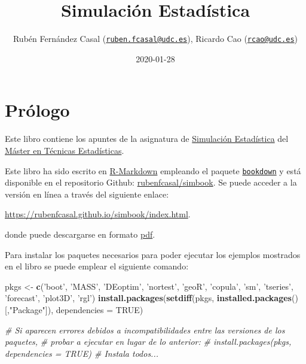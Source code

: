 \documentclass[]{book}
\title{Simulación Estadística}
\author{Rubén Fernández Casal
(\href{mailto:ruben.fcasal@udc.es}{\nolinkurl{ruben.fcasal@udc.es}}),
Ricardo Cao (\href{mailto:rcao@udc.es}{\nolinkurl{rcao@udc.es}})}
\date{2020-01-28}
\newenvironment{Shaded}{\begin{snugshade}}{\end{snugshade}}
\newcommand{\KeywordTok}[1]{\textcolor[rgb]{0.13,0.29,0.53}{\textbf{#1}}}
\newcommand{\DataTypeTok}[1]{\textcolor[rgb]{0.13,0.29,0.53}{#1}}
\newcommand{\StringTok}[1]{\textcolor[rgb]{0.31,0.60,0.02}{#1}}
\newcommand{\CommentTok}[1]{\textcolor[rgb]{0.56,0.35,0.01}{\textit{#1}}}
\newcommand{\OtherTok}[1]{\textcolor[rgb]{0.56,0.35,0.01}{#1}}
\newcommand{\NormalTok}[1]{#1}
\theoremstyle{definition}
\theoremstyle{definition}
\theoremstyle{definition}
\theoremstyle{remark}
\begin{document}
\maketitle

{
\setcounter{tocdepth}{1}
\tableofcontents
}
\chapter*{Prólogo}\label{prologo}

Este libro contiene los apuntes de la asignatura de
\href{http://eamo.usc.es/pub/mte/index.php/es/?option=com_content\&view=article\&id=2201\&idm=13\&a\%C3\%B1o=2019}{Simulación
Estadística} del \href{http://eio.usc.es/pub/mte}{Máster en Técnicas
Estadísticas}.

Este libro ha sido escrito en
\href{http://rmarkdown.rstudio.com}{R-Markdown} empleando el paquete
\href{https://bookdown.org/yihui/bookdown/}{\texttt{bookdown}} y está
disponible en el repositorio Github:
\href{https://github.com/rubenfcasal/simbook}{rubenfcasal/simbook}. Se
puede acceder a la versión en línea a través del siguiente enlace:

\url{https://rubenfcasal.github.io/simbook/index.html}.

donde puede descargarse en formato
\href{https://rubenfcasal.github.io/simbook/Simulacion.pdf}{pdf}.

Para instalar los paquetes necesarios para poder ejecutar los ejemplos
mostrados en el libro se puede emplear el siguiente comando:

\begin{Shaded}
\begin{Highlighting}[]
\NormalTok{pkgs <-}\StringTok{ }\KeywordTok{c}\NormalTok{(}\StringTok{'boot'}\NormalTok{, }\StringTok{'MASS'}\NormalTok{, }\StringTok{'DEoptim'}\NormalTok{, }\StringTok{'nortest'}\NormalTok{, }\StringTok{'geoR'}\NormalTok{, }\StringTok{'copula'}\NormalTok{, }\StringTok{'sm'}\NormalTok{,}
          \StringTok{'tseries'}\NormalTok{, }\StringTok{'forecast'}\NormalTok{, }\StringTok{'plot3D'}\NormalTok{, }\StringTok{'rgl'}\NormalTok{)}
\KeywordTok{install.packages}\NormalTok{(}\KeywordTok{setdiff}\NormalTok{(pkgs, }\KeywordTok{installed.packages}\NormalTok{()[,}\StringTok{"Package"}\NormalTok{]), }
                 \DataTypeTok{dependencies =} \OtherTok{TRUE}\NormalTok{)}

\CommentTok{# Si aparecen errores debidos a incompatibilidades entre las versiones de los paquetes, }
\CommentTok{# probar a ejecutar en lugar de lo anterior:}
\CommentTok{# install.packages(pkgs, dependencies = TRUE) # Instala todos...}
\end{Highlighting}
\end{Shaded}
\end{document}
